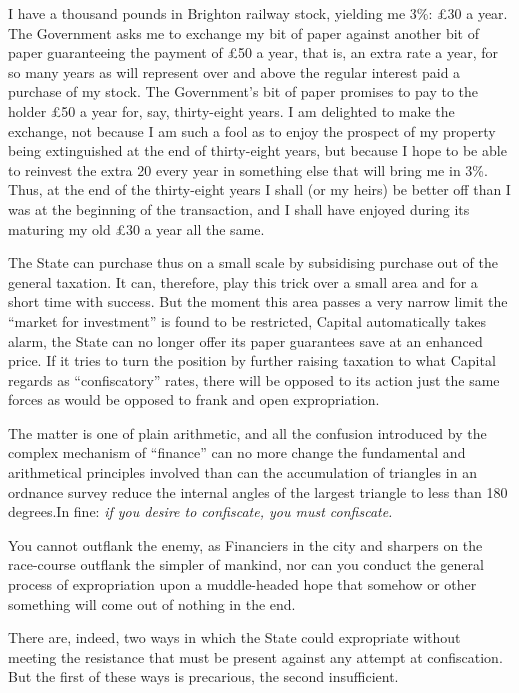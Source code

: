 \documentclass{book}
\begin{document}
I have a thousand pounds in Brighton railway stock, yielding me 3\%: £30 a year. The Government asks me to exchange my bit of paper against another bit of paper guaranteeing the payment of £50 a year, that is, an extra rate a year, for so many years as will represent over and above the regular interest paid a purchase of my stock. The Government’s bit of paper promises to pay to the holder £50 a year for, say, thirty-eight years. I am delighted to make the exchange, not because I am such a fool as to enjoy the prospect of my property being extinguished at the end of thirty-eight years, but because I hope to be able to reinvest the extra 20 every year in something else that will bring me in 3\%. Thus, at the end of the thirty-eight years I shall (or my heirs) be better off than I was at the beginning of the transaction, and I shall have enjoyed during its maturing my old £30 a year all the same.

The State can purchase thus on a small scale by subsidising purchase out of the general taxation. It can, therefore, play this trick over a small area and for a short time with success. But the moment this area passes a very narrow limit the “market for investment” is found to be restricted, Capital automatically takes alarm, the State can no longer offer its paper guarantees save at an enhanced price. If it tries to turn the position by further raising taxation to what Capital regards as “confiscatory” rates, there will be opposed to its action just the same forces as would be opposed to frank and open expropriation.

The matter is one of plain arithmetic, and all the confusion introduced by the complex mechanism of “finance” can no more change the fundamental and arithmetical principles involved than can the accumulation of triangles in an ordnance survey reduce the internal angles of the largest triangle to less than 180 degrees.\footnotemark[3] In fine: \emph{if you desire to confiscate, you must confiscate.}

You cannot outflank the enemy, as Financiers in the city and sharpers on the race-course outflank the simpler of mankind, nor can you conduct the general process of expropriation upon a muddle-headed hope that somehow or other something will come out of nothing in the end.

There are, indeed, two ways in which the State could expropriate without meeting the resistance that must be present against any attempt at confiscation. But the first of these ways is precarious, the second insufficient.
\end{document}
